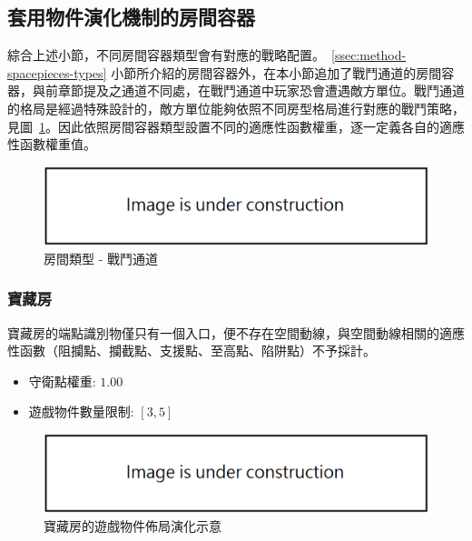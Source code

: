 \subsection{套用物件演化機制的房間容器}
\label{ssec:method-segments-appliedonvolumes}

綜合上述小節，不同房間容器類型會有對應的戰略配置。~\ref{ssec:method-spacepieces-types} 小節所介紹的房間容器外，在本小節追加了戰鬥通道的房間容器，與前章節提及之通道不同處，在戰鬥通道中玩家恐會遭遇敵方單位。戰鬥通道的格局是經過特殊設計的，敵方單位能夠依照不同房型格局進行對應的戰鬥策略，見圖~\ref{fig:roomtype-mainpath-extend}。因此依照房間容器類型設置不同的適應性函數權重，逐一定義各自的適應性函數權重值。

\begin{figure}[ht]
  \begin{center}
    \includegraphics[width=1.0\textwidth]{figures/under_construction.png}
    \caption{房間類型 - 戰鬥通道}
    \label{fig:roomtype-mainpath-extend}
  \end{center}
\end{figure}

\subsubsection{寶藏房}
\label{sssec:method-segments-appliedonvolumes-none}

寶藏房的端點識別物僅只有一個入口，便不存在空間動線，與空間動線相關的適應性函數（阻攔點、攔截點、支援點、至高點、陷阱點）不予採計。

\begin{itemize}
  \setlength\itemsep{-0.5em}
  \item 守衛點權重: $1.00$
  \item 遊戲物件數量限制: $[3, 5]$
\end{itemize}

\begin{figure}[ht]
  \begin{center}
    \includegraphics[width=1.0\textwidth]{figures/under_construction.png}
    \caption{寶藏房的遊戲物件佈局演化示意} 
    \label{fig:applied-ga-on-volume-battlepath-ii}
  \end{center}
\end{figure}


